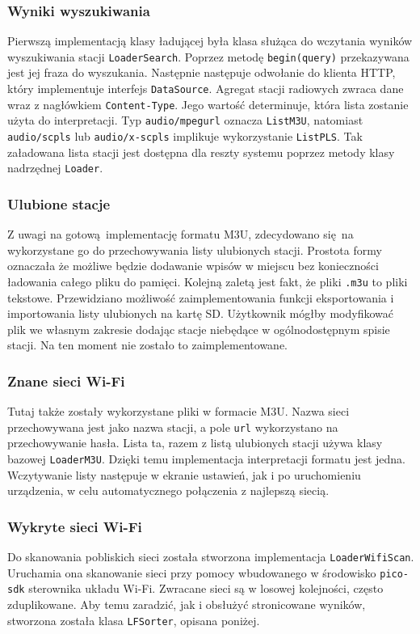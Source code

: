 \documentclass[polish]{aghengthesis}
\begin{document}
			\subsubsection{Wyniki wyszukiwania}
				Pierwszą implementacją klasy ładującej była klasa służąca do wczytania wyników wyszukiwania stacji \lstinline|LoaderSearch|. Poprzez metodę \lstinline|begin(query)| przekazywana jest jej fraza do wyszukania. Następnie następuje odwołanie do klienta HTTP, który implementuje interfejs \lstinline|DataSource|. Agregat stacji radiowych zwraca dane wraz z nagłówkiem \lstinline|Content-Type|. Jego wartość determinuje, która lista zostanie użyta do interpretacji. Typ \lstinline|audio/mpegurl| oznacza \lstinline|ListM3U|, natomiast \lstinline|audio/scpls| lub \lstinline|audio/x-scpls| implikuje wykorzystanie \lstinline|ListPLS|. Tak załadowana lista stacji jest dostępna dla reszty systemu poprzez metody klasy nadrzędnej \lstinline|Loader|.
			
			\subsubsection{Ulubione stacje}
				Z uwagi na gotową implementację formatu M3U, zdecydowano się na wykorzystane go do przechowywania listy ulubionych stacji. Prostota formy oznaczała że możliwe będzie dodawanie wpisów w miejscu bez konieczności ładowania całego pliku do pamięci. Kolejną zaletą jest fakt, że pliki \lstinline|.m3u| to pliki tekstowe. Przewidziano możliwość zaimplementowania funkcji eksportowania i importowania listy ulubionych na kartę SD. Użytkownik mógłby modyfikować plik we własnym zakresie dodając stacje niebędące w ogólnodostępnym spisie stacji. Na ten moment nie zostało to zaimplementowane.

			\subsubsection{Znane sieci Wi-Fi}
				Tutaj także zostały wykorzystane pliki w formacie M3U. Nazwa sieci przechowywana jest jako nazwa stacji, a pole \lstinline|url| wykorzystano na przechowywanie hasła. Lista ta, razem z listą ulubionych stacji używa klasy bazowej \lstinline|LoaderM3U|. Dzięki temu implementacja interpretacji formatu jest jedna. Wczytywanie listy następuje w ekranie ustawień, jak i po uruchomieniu urządzenia, w celu automatycznego połączenia z najlepszą siecią.
				
			\subsubsection{Wykryte sieci Wi-Fi}
				Do skanowania pobliskich sieci została stworzona implementacja \lstinline|LoaderWifiScan|. Uruchamia ona skanowanie sieci przy pomocy wbudowanego w środowisko \lstinline|pico-sdk| sterownika układu Wi-Fi. Zwracane sieci są w losowej kolejności, często zduplikowane. Aby temu zaradzić, jak i obsłużyć stronicowane wyników, stworzona została klasa \lstinline|LFSorter|, opisana poniżej.
				
\end{document}

